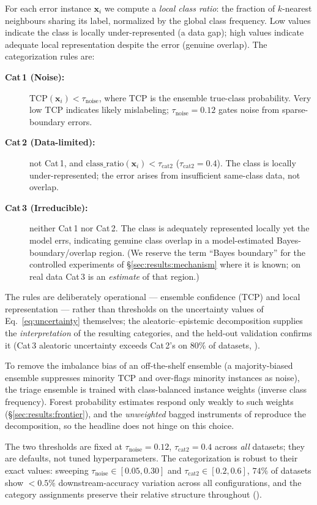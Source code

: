 For each error instance $\mathbf{x}_i$ we compute a \emph{local class ratio}: the
fraction of $k$-nearest neighbours sharing its label, normalized by the global
class frequency. Low values indicate the class is locally under-represented (a
data gap); high values indicate adequate local representation despite the error
(genuine overlap). The categorization rules are:
\begin{description}
\item[\textbf{Cat\,1 (Noise):}] $\mathrm{TCP}(\mathbf{x}_i) < \tau_{\text{noise}}$,
  where TCP is the ensemble true-class probability. Very low TCP indicates likely
  mislabeling; $\tau_{\text{noise}}=0.12$ gates noise from sparse-boundary errors.
\item[\textbf{Cat\,2 (Data-limited):}] not Cat\,1, and
  $\mathrm{class\_ratio}(\mathbf{x}_i) < \tau_{\text{cat2}}$ ($\tau_{\text{cat2}}=0.4$).
  The class is locally under-represented; the error arises from insufficient
  same-class data, not overlap.
\item[\textbf{Cat\,3 (Irreducible):}] neither Cat\,1 nor Cat\,2. The class is
  adequately represented locally yet the model errs, indicating genuine class
  overlap in a model-estimated Bayes-boundary/overlap region. (We reserve the term
  ``Bayes boundary'' for the controlled experiments of \S\ref{sec:results:mechanism}
  where it is known; on real data Cat\,3 is an \emph{estimate} of that region.)
\end{description}
The rules are deliberately operational --- ensemble confidence (TCP) and local
representation --- rather than thresholds on the uncertainty values of
Eq.~\eqref{eq:uncertainty} themselves; the aleatoric--epistemic decomposition
supplies the \emph{interpretation} of the resulting categories, and the held-out
validation confirms it (Cat\,3 aleatoric uncertainty exceeds Cat\,2's on $80\%$
of datasets, ).

To remove the imbalance bias of an off-the-shelf ensemble (a majority-biased
ensemble suppresses minority TCP and over-flags minority instances as noise), the
triage ensemble is trained with class-balanced instance weights (inverse class
frequency). Forest probability estimates respond only weakly to such weights
(\S\ref{sec:results:frontier}), and the \emph{unweighted} bagged instruments of
 reproduce the decomposition, so the headline does not hinge
on this choice.

The two thresholds are fixed at $\tau_{\text{noise}}=0.12$, $\tau_{\text{cat2}}=0.4$
across \emph{all} datasets; they are defaults, not tuned hyperparameters. The
categorization is robust to their exact values: sweeping
$\tau_{\text{noise}}\in[0.05,0.30]$ and $\tau_{\text{cat2}}\in[0.2,0.6]$, $74\%$ of
datasets show $<0.5\%$ downstream-accuracy variation across all configurations, and
the category assignments preserve their relative structure throughout
().

